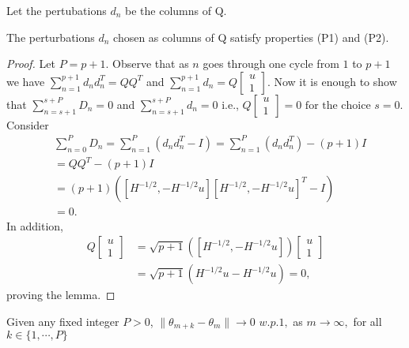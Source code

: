 Let the pertubations $d_n$ be the columns of Q. 
\begin{lemma}
 The perturbations $d_n$ chosen as columns of Q satisfy properties (P1) and (P2).
\end{lemma}
\begin{proof}
 Let $P=p+1$. Observe that as $n$ goes through one cycle from $1$ to $p+1$ we have
 $\sum\limits_{n=1}^{p+1}d_nd_n^T=QQ^T$ and 
 $\sum\limits_{n=1}^{p+1}d_n= Q\left[\begin{array}{cccc}
 u\\ 1 \end{array}\right]$.
 Now it is enough to show that
 $\sum\limits_{n=s+1}^{s+P}D_n=0$ and 
 $\sum\limits_{n=s+1}^{s+P}d_n= 0$ i.e., 
 $Q\left[\begin{array}{cccc}
 u\\ 1 \end{array}\right]=0 \text{ for the choice } s=0.$
 Consider
 \begin{align*}
 & \sum_{n=0}^{P}D_n=\sum_{n=1}^{P}(d_nd_n^T-I)=\sum_{n=1}^{P}(d_nd_n^T)-(p+1)I\\
 & =QQ^T-(p+1)I\\
 & =(p+1)([H^{-1/2},-H^{-1/2}u][H^{-1/2},-H^{-1/2}u]^T-I)\\
 & = 0.
 \end{align*}
 In addition,
 \begin{align*}
 Q\left[\begin{array}{cccc}
 u\\ 1 \end{array}\right]
 & = \sqrt{p+1}([H^{-1/2},-H^{-1/2}u]) \left[\begin{array}{cccc}
 u\\ 1 \end{array}\right]\\
 & = \sqrt{p+1}(H^{-1/2}u-H^{-1/2}u)= 0,
 \end{align*}
proving the lemma.
\end{proof}
\begin{lemma}
 Given any fixed integer $P>0$, $\|\theta_{m+k}-\theta_{m}\| \rightarrow 0$ $w.p.1,$ as
 $m \rightarrow \infty,$ for all $k \in \{1,\cdots, P\}$
\end{lemma}
